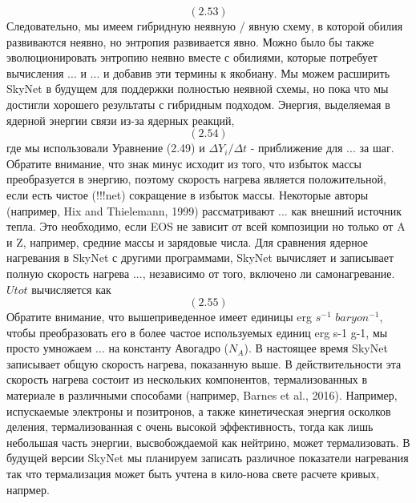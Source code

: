 \documentclass[%
bachelor,    %
natbib,      %
subf,        %
href,        %
colorlinks,  %
]{disser}
\begin{document}
$$(2.53)$$
Следовательно, мы имеем гибридную неявную / явную схему, в которой обилия развиваются неявно, но энтропия развивается явно. Можно было бы также эволюционировать энтропию неявно вместе с обилиями, которые потребует вычисления $...$ и $...$ и добавив эти термины к якобиану. Мы можем расширить SkyNet в будущем для поддержки полностью неявной схемы, но пока что мы достигли хорошего результаты с гибридным подходом.
Энергия, выделяемая в ядерной энергии связи из-за ядерных реакций,
$$(2.54)$$
где мы использовали Уравнение (2.49) и $\Delta Y_i / \Delta t$ - приближение для $...$ за шаг. Обратите внимание, что знак минус исходит из того, что избыток массы преобразуется в энергию, поэтому скорость нагрева является положительной, если есть чистое (!!!net) сокращение в избыток массы. Некоторые авторы (например, Hix and Thielemann, 1999) рассматривают $...$ как внешний источник тепла. Это необходимо, если EOS не зависит от всей композиции но только от A и Z, например, средние массы и зарядовые числа. Для сравнения ядерное нагревания в SkyNet с другими программами, SkyNet вычисляет и записывает полную скорость нагрева $...$, независимо от того, включено ли самонагревание. $Utot$ вычисляется как
$$(2.55)$$
Обратите внимание, что вышеприведенное имеет единицы erg $s^{-1}$ $baryon^{-1}$, чтобы преобразовать его в более частое используемых единиц erg s-1 g-1, мы просто умножаем $...$ на константу Авогадро ($N_A$).
В настоящее время SkyNet записывает общую скорость нагрева, показанную выше. В действительности эта скорость нагрева состоит из нескольких компонентов, термализованных в материале в различными способами (например, Barnes et al., 2016). Например, испускаемые электроны и позитронов, а также кинетическая энергия осколков деления, термализованная с очень высокой эффективность, тогда как лишь небольшая часть энергии, высвобождаемой как нейтрино, может термализовать. В будущей версии SkyNet мы планируем записать различное показатели нагревания так что термализация может быть учтена в кило-нова свете расчете кривых, напрмер.
\end{document}
